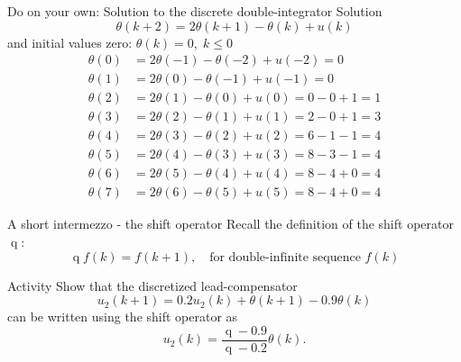 \documentclass[presentation,aspectratio=1610]{beamer}
\DeclareMathOperator{\shift}{q}
\begin{document}
\begin{frame}[label={sec:orgfcb06cf}]{Do on your own: Solution to the discrete double-integrator}
\alert{Solution}
\footnotesize
\[ \theta(k+2) =  2\theta(k+1) - \theta(k) + u(k)\]
and initial values zero: \( \theta(k) = 0, \; k \le 0 \) 
\begin{align*}
 \theta(0) &=  2\theta(-1) - \theta(-2) + u(-2) = 0\\
 \theta(1) &=  2\theta(0) - \theta(-1) + u(-1) = 0\\
 \theta(2) &=  2\theta(1) - \theta(0) + u(0) = 0 - 0 + 1 = 1\\
 \theta(3) &=  2\theta(2) - \theta(1) + u(1) = 2 - 0 + 1 = 3\\
 \theta(4) &=  2\theta(3) - \theta(2) + u(2) = 6 - 1 - 1 = 4\\
 \theta(5) &=  2\theta(4) - \theta(3) + u(3) = 8 - 3 - 1 = 4\\
 \theta(6) &=  2\theta(5) - \theta(4) + u(4) = 8 - 4 +0= 4\\
 \theta(7) &=  2\theta(6) - \theta(5) + u(5) = 8 - 4 +0= 4
 \end{align*}
   \begin{center}
   \end{center}
\end{frame}

\begin{frame}[label={sec:org278229e}]{A short intermezzo - the shift operator}
Recall the definition of the shift operator \(\shift\):
\[ \shift f(k) = f(k+1), \quad \text{for double-infinite sequence $f(k)$} \]

\alert{Activity} Show that the discretized lead-compensator
\[ u_2(k+1) = 0.2u_2(k) + \theta(k+1) - 0.9\theta(k)\]
can be written using the shift operator as 
\[ u_2(k) = \frac{\shift -0.9}{\shift - 0.2} \theta(k).\]
\end{frame}
\end{document}
